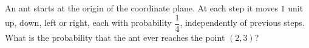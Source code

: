 An ant starts at the origin of the coordinate plane. At each step it moves $1$ unit up, down, left or right, each with probability $\dfrac14$, independently of previous steps. What is the probability that the ant ever reaches the point $(2,3)$?
